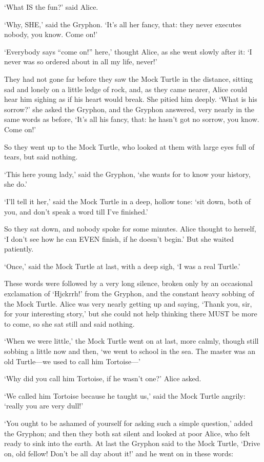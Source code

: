 \documentclass[12pt]{book}
\begin{document}
\begin{Parallel}[p]{}{}
{‘What IS the fun?’ said Alice.

‘Why, SHE,’ said the Gryphon. ‘It’s all her fancy, that: they never executes nobody, you know. Come on!’

‘Everybody says “come on!” here,’ thought Alice, as she went slowly after it: ‘I never was so ordered about in all my life, never!’

They had not gone far before they saw the Mock Turtle in the distance, sitting sad and lonely on a little ledge of rock, and, as they came nearer, Alice could hear him sighing as if his heart would break. She pitied him deeply. ‘What is his sorrow?’ she asked the Gryphon, and the Gryphon answered, very nearly in the same words as before, ‘It’s all his fancy, that: he hasn’t got no sorrow, you know. Come on!’

So they went up to the Mock Turtle, who looked at them with large eyes full of tears, but said nothing.

‘This here young lady,’ said the Gryphon, ‘she wants for to know your history, she do.’

‘I’ll tell it her,’ said the Mock Turtle in a deep, hollow tone: ‘sit down, both of you, and don’t speak a word till I’ve finished.’

So they sat down, and nobody spoke for some minutes. Alice thought to herself, ‘I don’t see how he can EVEN finish, if he doesn’t begin.’ But she waited patiently.

‘Once,’ said the Mock Turtle at last, with a deep sigh, ‘I was a real Turtle.’

These words were followed by a very long silence, broken only by an occasional exclamation of ‘Hjckrrh!’ from the Gryphon, and the constant heavy sobbing of the Mock Turtle. Alice was very nearly getting up and saying, ‘Thank you, sir, for your interesting story,’ but she could not help thinking there MUST be more to come, so she sat still and said nothing.

‘When we were little,’ the Mock Turtle went on at last, more calmly, though still sobbing a little now and then, ‘we went to school in the sea. The master was an old Turtle—we used to call him Tortoise—’

‘Why did you call him Tortoise, if he wasn’t one?’ Alice asked.

‘We called him Tortoise because he taught us,’ said the Mock Turtle angrily: ‘really you are very dull!’

‘You ought to be ashamed of yourself for asking such a simple question,’ added the Gryphon; and then they both sat silent and looked at poor Alice, who felt ready to sink into the earth. At last the Gryphon said to the Mock Turtle, ‘Drive on, old fellow! Don’t be all day about it!’ and he went on in these words:

}
\end{Parallel}
\end{document}
